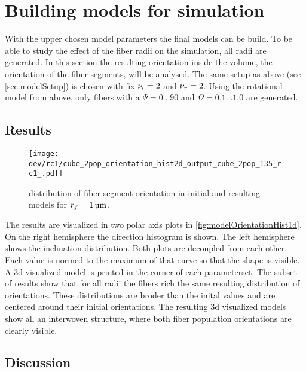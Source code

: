 \section{Building models for simulation}
% 
With the upper chosen model parameters the final models can be build.
To be able to study the effect of the fiber radii on the simulation, all radii are generated.
In this section the resulting orientation inside the volume, \ie{} the orientation of the fiber segments, will be analysed.
The same setup as above (see \cref{sec:modelSetup}) is chosen with fix $\textnormal{$\nu_{l}$}=\SI{2}{}$ and $\textnormal{$\nu_{r}$} = \SI{2}{}$.
Using the rotational model from above, only fibers with a $\Psi =  0...90$ and $\Omega = 0.1...1.0$ are generated.
% 
% 
% 
\subsection{Results}
% 
\begin{figure}[!t]
\centering
\texttt{[image: dev/rc1/cube\_2pop\_orientation\_hist2d\_output\_cube\_2pop\_135\_rc1\_.pdf]}
\caption[Model orientation histograms]{distribution of fiber segment orientation in initial and resulting models for $\fiberRadius = \SI{1}{\micro\meter}$.  }
\label{fig:modelOrientation}
\end{figure}
% 
% 
The results are visualized in two polar axis plots in \cref{fig:modelOrientationHist1d}. On the right hemisphere the direction histogram is shown.
The left hemisphere shows the inclination distribution.
Both plots are decoupled from each other. 
Each value is normed to the maximum of that curve so that the shape is visible.
A 3d visualized model is printed in the corner of each parameterset.
% 
The subset of results show that for all radii the fibers rich the same resulting distribution of orientations. 
These distributions are broder than the inital values and are centered around their initial orientations.
The resulting 3d visualized models show all an interwoven structure, where both fiber population orientations are clearly visible. 
%  
\subsection{Discussion}
%
% 
